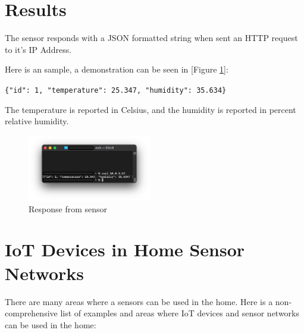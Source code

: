 \documentclass[10pt, journal]{IEEEtran} %
\begin{document}
\section{Results}

The sensor responds with a JSON formatted string when sent an HTTP request to it's IP Address.

Here is an sample, a demonstration can be seen in [Figure \ref{fig:sensor_response}]:

\lstinline[basicstyle=\footnotesize]|{"id": 1, "temperature": 25.347, "humidity": 35.634}|

The temperature is reported in Celsius, and the humidity is reported in percent relative humidity.

\begin{figure}[htbp]
    \centering
    \includegraphics[width=0.48\textwidth]{images/sensor_response.png}
    \caption{Response from sensor}
    \label{fig:sensor_response}
\end{figure}


\section{IoT Devices in Home Sensor Networks}

There are many areas where a sensors can be used in the home.
Here is a non-comprehensive list of examples and areas where
IoT devices and sensor networks can be used in the home:
\end{document}
